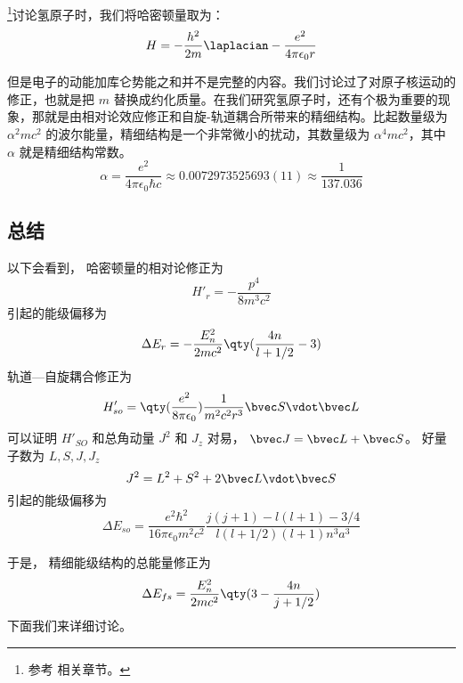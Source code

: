 
\begin{issues}
\issueDraft
\end{issues}

\footnote{参考 \cite{GriffQ} 相关章节。}讨论氢原子时，我们将哈密顿量取为：\begin{equation}
H=-\frac{h^2}{2m}\laplacian-\frac{e^2}{4\pi\epsilon_0 r}
\end{equation}

但是电子的动能加库仑势能之和并不是完整的内容。我们讨论过了对原子核运动的修正，也就是把 $m$ 替换成约化质量。在我们研究氢原子时，还有个极为重要的现象，那就是由相对论效应修正和自旋-轨道耦合所带来的精细结构。比起数量级为 $\alpha^2 mc^2$ 的波尔能量，精细结构是一个非常微小的扰动，其数量级为 $\alpha^4 mc^2$，其中 $\alpha$ 就是精细结构常数。
\begin{equation}
\alpha = \frac{e^2}{4\pi\epsilon_0\hbar c} \approx 0.0072973525693(11) \approx \frac{1}{137.036}
\end{equation}

\subsection{总结}
以下会看到， 哈密顿量的相对论修正为
\begin{equation}\label{HfineS_eq2}
H'_r = -\frac{p^4}{8m^3 c^2}
\end{equation}
引起的能级偏移为
\begin{equation}
\Delta E_r = -\frac{E_n^2}{2mc^2} \qty(\frac{4n}{l+1/2}-3)
\end{equation}
轨道—自旋耦合修正为
\begin{equation}\label{HfineS_eq3}
H'_{so} = \qty(\frac{e^2}{8\pi\epsilon_0}) \frac{1}{m^2c^2 r^3} \bvec S \vdot \bvec L
\end{equation}
可以证明 $H'_{SO}$ 和总角动量 $J^2$ 和 $J_z$ 对易， $\bvec J = \bvec L + \bvec S$。 好量子数为 $L, S, J, J_z$
\begin{equation}
J^2 = L^2 + S^2 + 2\bvec L \vdot \bvec S
\end{equation}
引起的能级偏移为
\begin{equation}
\Delta E_{so} = \frac{e^2\hbar^2}{16\pi\epsilon_0 m^2 c^2} \frac{j(j+1) - l(l+1) - 3/4}{l(l+1/2)(l+1)n^3 a^3}
\end{equation}

于是， 精细能级结构的总能量修正为
\begin{equation}
\Delta E_{fs} = \frac{E_n^2}{2mc^2}\qty(3 - \frac{4n}{j + 1/2})
\end{equation}
下面我们来详细讨论。

